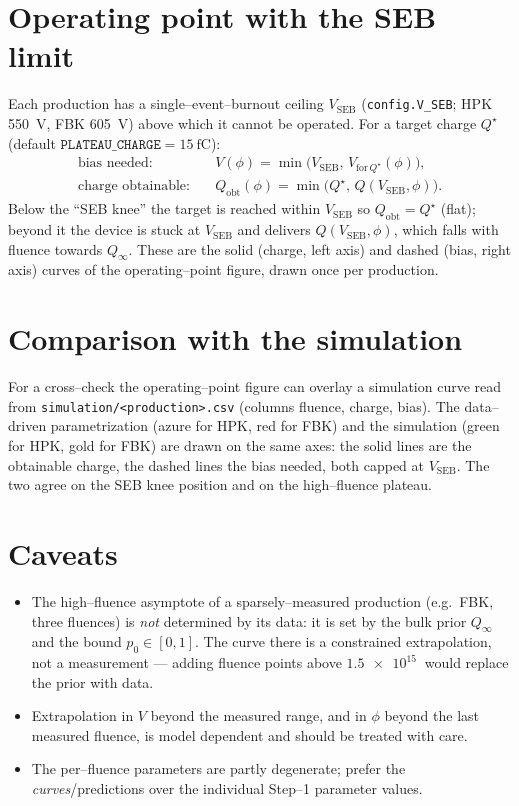 \documentclass[11pt]{article}
\newcommand{\fC}{\ensuremath{\mathrm{fC}}}
\newcommand{\code}[1]{\texttt{#1}}
\begin{document}
\section{Operating point with the SEB limit}
Each production has a single--event--burnout ceiling $V_{\mathrm{SEB}}$
(\code{config.V\_SEB}; HPK \SI{550}{\volt}, FBK \SI{605}{\volt}) above which it
cannot be operated. For a target charge $Q^\star$ (default
$\code{PLATEAU\_CHARGE}=\SI{15}{\fC}$):
\begin{align}
  \text{bias needed:}\quad & V(\phi) = \min\!\big(V_{\mathrm{SEB}},\,
      V_{\mathrm{for}\,Q^\star}(\phi)\big),\\
  \text{charge obtainable:}\quad & Q_{\mathrm{obt}}(\phi) =
      \min\!\big(Q^\star,\, Q(V_{\mathrm{SEB}},\phi)\big).
\end{align}
Below the ``SEB knee'' the target is reached within $V_{\mathrm{SEB}}$ so
$Q_{\mathrm{obt}}=Q^\star$ (flat); beyond it the device is stuck at
$V_{\mathrm{SEB}}$ and delivers $Q(V_{\mathrm{SEB}},\phi)$, which falls with fluence
towards $Q_\infty$. These are the solid (charge, left axis) and dashed (bias, right
axis) curves of the operating--point figure, drawn once per production.

\section{Comparison with the simulation}
For a cross--check the operating--point figure can overlay a simulation curve read
from \code{simulation/<production>.csv} (columns fluence, charge, bias). The
data--driven parametrization (azure for HPK, red for FBK) and the simulation
(green for HPK, gold for FBK) are drawn on the same axes: the solid lines are the
obtainable charge, the dashed lines the bias needed, both capped at $V_{\mathrm{SEB}}$.
The two agree on the SEB knee position and on the high--fluence plateau.

\section{Caveats}
\begin{itemize}[nosep]
  \item The high--fluence asymptote of a sparsely--measured production (e.g.\ FBK,
        three fluences) is \emph{not} determined by its data: it is set by the bulk
        prior $Q_\infty$ and the bound $p_0\in[0,1]$. The curve there is a
        constrained extrapolation, not a measurement --- adding fluence points above
        $\SI{1.5e15}{}$ would replace the prior with data.
  \item Extrapolation in $V$ beyond the measured range, and in $\phi$ beyond the
        last measured fluence, is model dependent and should be treated with care.
  \item The per--fluence parameters are partly degenerate; prefer the
        \emph{curves}/predictions over the individual Step--1 parameter values.
\end{itemize}
\end{document}
